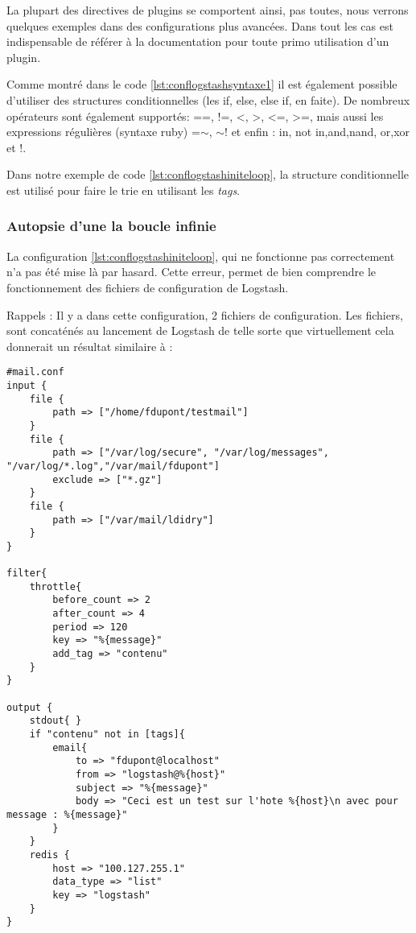 La plupart des directives de plugins se comportent ainsi, pas toutes, nous
verrons quelques exemples dans des configurations plus avancées. Dans tout les cas 
est indispensable de référer à la documentation pour toute primo utilisation d'un
plugin.


Comme montré dans le code \ref{lst:conflogstashsyntaxe1} il est également possible 
d'utiliser des structures conditionnelles (les if, else, else if, en faite).
De nombreux opérateurs sont également supportés: ==, !=, <, >, <=, >=, mais aussi
les expressions régulières (syntaxe ruby) =$\sim$, $\sim$! et enfin : in, not in,and,nand,
or,xor et !. 

Dans notre exemple de code \ref{lst:conflogstashiniteloop}, la structure conditionnelle
est utilisé pour faire le trie en utilisant les \emph{tags}.

\subsubsection{Autopsie d'une la boucle infinie}
La configuration \ref{lst:conflogstashiniteloop}, qui ne fonctionne pas
correctement n'a pas été mise là par hasard. Cette erreur, permet de bien comprendre 
le fonctionnement des fichiers de configuration de Logstash.

Rappels : Il y a dans cette configuration, 2 fichiers de configuration. Les fichiers,
sont concaténés au lancement de Logstash de telle sorte que virtuellement cela donnerait 
un résultat similaire à :


\begin{lstlisting}[style=logstash,label={lst:conflogstashiniteloop2},caption={Infinite loop concaténé}]
#mail.conf
input {
    file {
        path => ["/home/fdupont/testmail"]
    }
    file {
        path => ["/var/log/secure", "/var/log/messages", "/var/log/*.log","/var/mail/fdupont"]
        exclude => ["*.gz"]
    }
    file {
        path => ["/var/mail/ldidry"]
    }
}

filter{
    throttle{
        before_count => 2
        after_count => 4
        period => 120
        key => "%{message}"
        add_tag => "contenu"
    }
}

output {
    stdout{ }
    if "contenu" not in [tags]{
        email{
            to => "fdupont@localhost"
            from => "logstash@%{host}"
            subject => "%{message}"
            body => "Ceci est un test sur l'hote %{host}\n avec pour message : %{message}"
        }
    }
    redis {
        host => "100.127.255.1"
        data_type => "list"
        key => "logstash"
    }
}
\end{lstlisting}

